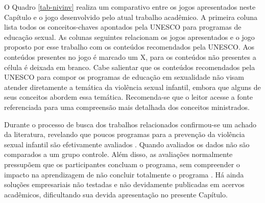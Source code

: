 

O Quadro \ref{tab-nivinv} realiza um comparativo entre os jogos apresentados neste Capítulo e o jogo desenvolvido pelo atual trabalho acadêmico. A primeira coluna lista todos os conceitos-chaves apontados pela UNESCO para programas de educação sexual. As colunas seguintes relacionam os jogos apresentados e o jogo proposto por esse trabalho com os conteúdos recomendados pela UNESCO. Aos conteúdos presentes no jogo é marcado um X, para os conteúdos não presentes a célula é deixada em branco. Cabe salientar que os conteúdos recomendados pela UNESCO para compor os programas de educação em sexualidade não visam atender diretamente a temática da violência sexual infantil, embora que alguns de seus conceitos abordem essa temática. Recomenda-se que o leitor acesse a fonte referenciada para uma compreensão mais detalhada dos conceitos ministrados.

Durante o processo de busca dos trabalhos relacionados confirmou-se um achado da literatura, revelando que poucos programas para a prevenção da violência sexual infantil são efetivamente avaliados \cite{sanderson2004child}. Quando avaliados os dados não são comparados a um grupo controle. Além disso, as avaliações normalmente pressupõem que os participantes concluam o programa, sem compreender o impacto na aprendizagem de não concluir totalmente o programa \cite{jones2020serious}. Há ainda soluções empresariais não testadas e não devidamente publicadas em acervos acadêmicos, dificultando sua devida apresentação no presente Capítulo. 




